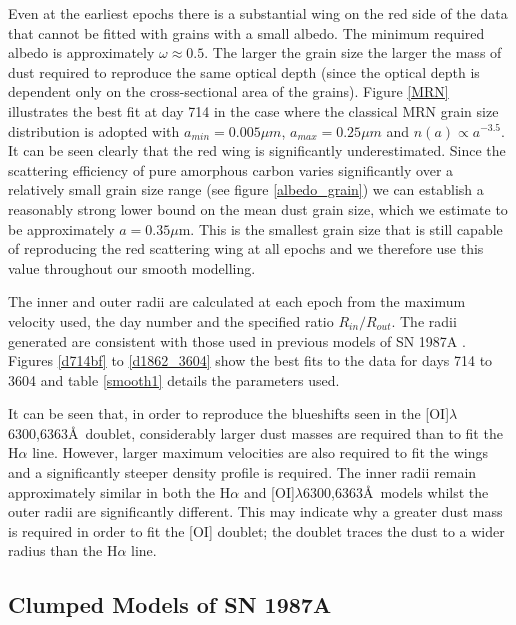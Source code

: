 \documentclass[useAMS,usenatbib,usegraphicx]{mnras}
\begin{document}
Even at the earliest epochs there is a substantial wing on the red side of the data that cannot be fitted with grains with a small albedo.  The minimum required albedo is approximately $\omega \approx 0.5$.  The larger the grain size the larger the mass of dust required to reproduce the same optical depth (since the optical depth is dependent only on the cross-sectional area of the grains).  Figure \ref{MRN} illustrates the best fit at day 714 in the case where the classical MRN grain size distribution is adopted with $a_{min}=0.005 \mu m$, $a_{max}=0.25 \mu m$ and $n(a) \propto a^{-3.5}$.  It can be seen clearly that the red wing is significantly underestimated.  Since the scattering efficiency of pure amorphous carbon varies significantly over a relatively small grain size range (see figure \ref{albedo_grain}) we can establish a reasonably strong lower bound on the mean dust grain size, which we estimate to be approximately $a=0.35\mu$m.  This is the smallest grain size that is still capable of reproducing the red scattering wing at all epochs and we therefore use this value throughout our smooth modelling.  

The inner and outer radii are calculated at each epoch from the maximum velocity used, the day number and the specified ratio $R_{in}/R_{out}$.  The radii generated are consistent with those used in previous models of SN 1987A \citep{Wesson2015,Ercolano2007}.  Figures \ref{d714bf} to \ref{d1862_3604} show the best fits to the data for days 714 to 3604 and table \ref{smooth1} details the parameters used.

It can be seen that, in order to reproduce the blueshifts seen in the [OI]$\lambda$6300,6363\AA\ doublet, considerably larger dust masses are required than to fit the H$\alpha$ line.  However, larger maximum velocities are also required to fit the wings and a significantly steeper density profile is required.  The inner radii remain approximately similar in both the H$\alpha$ and [OI]$\lambda$6300,6363\AA\ models whilst the outer radii are significantly different.  This may indicate why a greater dust mass is required in order to fit the [OI] doublet; the doublet traces the dust to a wider radius than the H$\alpha$ line.



\subsection{Clumped Models of SN 1987A}
\label{clumped_models}
\end{document}
